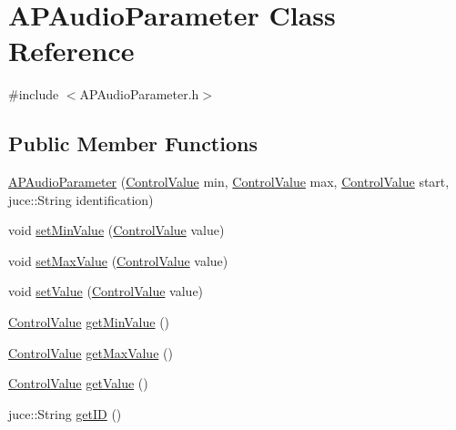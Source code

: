 \hypertarget{class_a_p_audio_parameter}{\section{A\+P\+Audio\+Parameter Class Reference}
\label{class_a_p_audio_parameter}
}


{\ttfamily \#include $<$A\+P\+Audio\+Parameter.\+h$>$}

\subsection*{Public Member Functions}
\begin{DoxyCompactItemize}
\item 
\hyperlink{class_a_p_audio_parameter_a307626b492f446520333c717d06d1718}{A\+P\+Audio\+Parameter} (\hyperlink{_a_p_audio_module_8h_a9219378a2632ccf0389d00317ce8cdc4}{Control\+Value} min, \hyperlink{_a_p_audio_module_8h_a9219378a2632ccf0389d00317ce8cdc4}{Control\+Value} max, \hyperlink{_a_p_audio_module_8h_a9219378a2632ccf0389d00317ce8cdc4}{Control\+Value} start, juce\+::\+String identification)
\item 
void \hyperlink{class_a_p_audio_parameter_a86fcc968ae6bd3c7cea44e29b4e1ad77}{set\+Min\+Value} (\hyperlink{_a_p_audio_module_8h_a9219378a2632ccf0389d00317ce8cdc4}{Control\+Value} value)
\item 
void \hyperlink{class_a_p_audio_parameter_ac1d7f5d9c8fc15f2f7f793bf9be9e5af}{set\+Max\+Value} (\hyperlink{_a_p_audio_module_8h_a9219378a2632ccf0389d00317ce8cdc4}{Control\+Value} value)
\item 
void \hyperlink{class_a_p_audio_parameter_a40800bb5d6a0bca6cfa75e2dd384d5ea}{set\+Value} (\hyperlink{_a_p_audio_module_8h_a9219378a2632ccf0389d00317ce8cdc4}{Control\+Value} value)
\item 
\hyperlink{_a_p_audio_module_8h_a9219378a2632ccf0389d00317ce8cdc4}{Control\+Value} \hyperlink{class_a_p_audio_parameter_a1704b4d9b97a8d1183cec6bfd5f8c9ec}{get\+Min\+Value} ()
\item 
\hyperlink{_a_p_audio_module_8h_a9219378a2632ccf0389d00317ce8cdc4}{Control\+Value} \hyperlink{class_a_p_audio_parameter_a2a0caf7e8db83f46edb7d184c7c58c08}{get\+Max\+Value} ()
\item 
\hyperlink{_a_p_audio_module_8h_a9219378a2632ccf0389d00317ce8cdc4}{Control\+Value} \hyperlink{class_a_p_audio_parameter_ad017230322b9fe2affaabfe53e83f8c5}{get\+Value} ()
\item 
juce\+::\+String \hyperlink{class_a_p_audio_parameter_a8389ec91a1171892e63e6a9aebee2ace}{get\+I\+D} ()
\end{DoxyCompactItemize}


